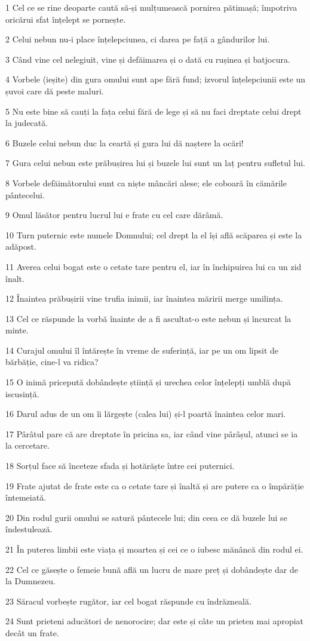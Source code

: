 \par 1 Cel ce se rine deoparte caută să-și mulțumească pornirea pătimașă; împotriva oricărui sfat înțelept se pornește.
\par 2 Celui nebun nu-i place înțelepciunea, ci darea pe față a gândurilor lui.
\par 3 Când vine cel nelegiuit, vine și defăimarea și o dată cu rușinea și batjocura.
\par 4 Vorbele (ieșite) din gura omului sunt ape fără fund; izvorul înțelepciunii este un șuvoi care dă peste maluri.
\par 5 Nu este bine să cauți la fața celui fără de lege și să nu faci dreptate celui drept la judecată.
\par 6 Buzele celui nebun duc la ceartă și gura lui dă naștere la ocări!
\par 7 Gura celui nebun este prăbușirea lui și buzele lui sunt un laț pentru sufletul lui.
\par 8 Vorbele defăimătorului sunt ca niște mâncări alese; ele coboară în cămările pântecelui.
\par 9 Omul lăsător pentru lucrul lui e frate cu cel care dărâmă.
\par 10 Turn puternic este numele Domnului; cel drept la el își află scăparea și este la adăpost.
\par 11 Averea celui bogat este o cetate tare pentru el, iar în închipuirea lui ca un zid înalt.
\par 12 Înaintea prăbușirii vine trufia inimii, iar înaintea măririi merge umilința.
\par 13 Cel ce răspunde la vorbă înainte de a fi ascultat-o este nebun și încurcat la minte.
\par 14 Curajul omului îl întărește în vreme de suferință, iar pe un om lipsit de bărbăție, cine-l va ridica?
\par 15 O inimă pricepută dobândește știință și urechea celor înțelepți umblă după iscusință.
\par 16 Darul adus de un om îi lărgește (calea lui) și-l poartă înaintea celor mari.
\par 17 Pârâtul pare că are dreptate în pricina sa, iar când vine pârâșul, atunci se ia la cercetare.
\par 18 Sorțul face să înceteze sfada și hotărăște între cei puternici.
\par 19 Frate ajutat de frate este ca o cetate tare și înaltă și are putere ca o împărăție întemeiată.
\par 20 Din rodul gurii omului se satură pântecele lui; din ceea ce dă buzele lui se îndestulează.
\par 21 În puterea limbii este viața și moartea și cei ce o iubesc mănâncă din rodul ei.
\par 22 Cel ce găsește o femeie bună află un lucru de mare preț și dobândește dar de la Dumnezeu.
\par 23 Săracul vorbește rugător, iar cel bogat răspunde cu îndrăzneală.
\par 24 Sunt prieteni aducători de nenorocire; dar este și câte un prieten mai apropiat decât un frate.

